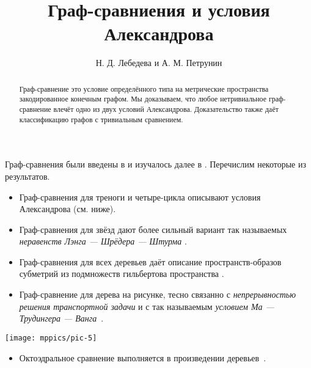\documentclass{article}
\def\thetitle{Граф-сравниения и условия Александрова}
\def\theauthors{Н. Д. Лебедева и А. М. Петрунин}
\def\parbf#1{\medskip\noindent{\bf #1}}
\begin{document}


\title{\thetitle}
\author{\theauthors}

\date{}
\maketitle
\begin{abstract}
Граф-сравнение это условие определённого типа на метрические пространства закодированное конечным графом.
Мы доказываем, что любое нетривиальное граф-сравнение влечёт одно из двух условий Александрова.
Доказательство также даёт классификацию графов с тривиальным сравнением.
\end{abstract}

\parbf{Предисловие.}
Граф-сравнения были введены в \cite{lebedeva-petrunin-zolotov} и изучалось далее в \cite{toyoda,toyoda2019,lebedeva-petrunin-CBB,lebedeva,lebedeva-petrunin,lebedeva-petrunin-octahedron}.
Перечислим некоторые из результатов.
\begin{itemize}
\item Граф-сравнения для треноги и четыре-цикла описывают условия Александрова (см. ниже).
\end{itemize}
\begin{itemize}
\item Граф-сравнения для звёзд дают более сильный вариант так называемых \emph{неравенств Лэнга --- Шрёдера --- Штурма} \cite{lang-schroeder, sturm, lebedeva-petrunin-CBB}.
\end{itemize}
\begin{itemize}
\item Граф-сравнения для всех деревьев даёт описание пространств-образов субметрий из подмножеств гильбертова пространства \cite{lebedeva-petrunin-zolotov}.
\end{itemize}

\noindent
\begin{minipage}
{.80\textwidth}
\begin{itemize}
\item Граф-сравнение для дерева на рисунке, тесно связанно с \emph{непрерывностью решения транспортной задачи} и с так называемым \emph{условием Ма --- Трудингера --- Ванга}~\cite{lebedeva-petrunin-zolotov,ma-trudinger-wang}.
\end{itemize}
\end{minipage}
\hfill
\begin{minipage}{.17\textwidth}
\centering
\vskip-1mm
\texttt{[image: mppics/pic-5]}
\end{minipage}
\begin{itemize}
\item Октоэдральное сравнение выполняется в произведении деревьев~\cite{lebedeva-petrunin-octahedron}.
\end{itemize}
\end{document}
